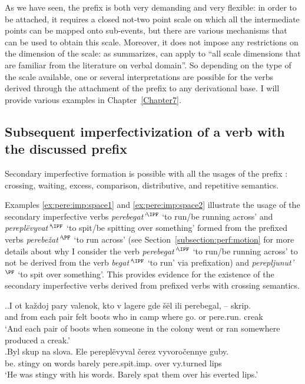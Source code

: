 As we have seen, the prefix  is both very demanding and very flexible: in order to be attached, it requires a closed not-two point scale on which all the intermediate points can be mapped onto sub-events, but there are various mechanisms that can be used to obtain this scale. Moreover, it does not impose any restrictions on the dimension of the scale: as \citet[151]{Kagan:book} summarizes,  can apply to ``all scale dimensions that are familiar from the literature on verbal domain''. So depending on the type of the scale available, one or several interpretations are possible for the verbs derived through the attachment of the prefix  to any derivational base. I will provide various examples in Chapter~\ref{Chapter7}.

\subsection{Subsequent imperfectivization of a verb with the discussed prefix}
Secondary imperfective formation is possible with all the usages of the prefix : crossing, waiting, excess, comparison, distributive, and repetitive semantics.

Examples \ref{ex:pere:imp:space1} and \ref{ex:pere:imp:space2} illustrate the usage of the secondary imperfective verbs \textit{perebegat'}$^{\IPF}$ `to run/be running across' and \textit{perepl\"{e}vyvat'}$^{\IPF}$ `to spit/be spitting over something' formed from the prefixed verbs \textit{perebe\v{z}at'}$^{\PF}$ `to run across' (see Section~\ref{subsection:perf:motion} for more details about why I consider the verb \textit{pe\-re\-be\-gat'}$^{\IPF}$ `to run/be running across' to not be derived from the verb \textit{begat'}$^{\IPF}$ `to run' via prefixation) and \textit{perepljunut'}$^{\PF}$ `to spit over something'. This provides evidence for the existence of the secondary imperfective verbs derived from prefixed verbs with crossing semantics.

\ex.\ag.\label{ex:pere:imp:space1}I ot ka\v{z}doj pary valenok, kto v lagere gde \v{s}\"{e}l ili perebegal, -- skrip.\\
and from each pair {felt boots} who in camp where go. or pere.run. {} creak\\
\trans `And each pair of boots when someone in the colony went or ran somewhere produced a creak.'\\
\bg.\label{ex:pere:imp:space2}Byl skup na slova. Ele perepl\"{e}vyval \v{c}erez vyvoro\v{c}ennye guby.\\
be. stingy on words barely pere.spit.imp. over vy.turned lips\\
\trans `He was stingy with his words. Barely spat them over his everted lips.'\\

